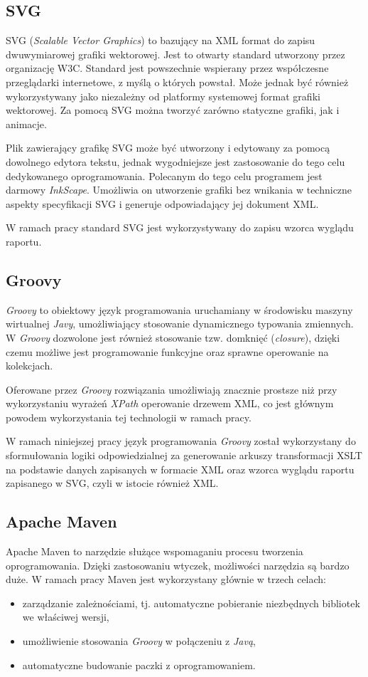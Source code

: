 \documentclass[11pt,a4paper]{article}
\begin{document}
\subsection{SVG} \label{tools:svg}
SVG (\emph{Scalable Vector Graphics}) to bazujący na XML format do zapisu dwuwymiarowej grafiki wektorowej. Jest to otwarty standard utworzony przez organizację W3C. Standard jest powszechnie wspierany przez współczesne przeglądarki internetowe, z myślą o których powstał. Może jednak być również wykorzystywany jako niezależny od platformy systemowej format grafiki wektorowej. Za pomocą SVG można tworzyć zarówno statyczne grafiki, jak i animacje.

Plik zawierający grafikę SVG może być utworzony i edytowany za pomocą dowolnego edytora tekstu, jednak wygodniejsze jest zastosowanie do tego celu dedykowanego oprogramowania. Polecanym do tego celu programem jest darmowy \emph{InkScape}. Umożliwia on utworzenie grafiki bez wnikania w techniczne aspekty specyfikacji SVG i generuje odpowiadający jej dokument XML.

W ramach pracy standard SVG jest wykorzystywany do zapisu wzorca wyglądu raportu. 

\subsection{Groovy} \label{tools:groovy}
\emph{Groovy} to obiektowy język programowania uruchamiany w środowisku maszyny wirtualnej \emph{Javy}, umożliwiający stosowanie dynamicznego typowania zmiennych. W \emph{Groovy} dozwolone jest również stosowanie tzw. domknięć (\emph{closure}), dzięki czemu możliwe jest programowanie funkcyjne oraz sprawne operowanie na kolekcjach. 

Oferowane przez \emph{Groovy} rozwiązania umożliwiają znacznie prostsze niż przy wykorzystaniu wyrażeń \emph{XPath} operowanie drzewem XML, co jest głównym powodem wykorzystania tej technologii w ramach pracy.

W ramach niniejszej pracy język programowania \emph{Groovy} został wykorzystany do sformułowania logiki odpowiedzialnej za generowanie arkuszy transformacji XSLT na podstawie danych zapisanych w formacie XML oraz wzorca wyglądu raportu zapisanego w SVG, czyli w istocie również XML. 

\subsection{Apache Maven} \label{tools:maven}
Apache Maven to narzędzie służące wspomaganiu procesu tworzenia oprogramowania. Dzięki zastosowaniu wtyczek, możliwości narzędzia są bardzo duże. W ramach pracy Maven jest wykorzystany głównie w trzech celach: 
\begin{itemize}
\item zarządzanie zależnościami, tj. automatyczne pobieranie niezbędnych bibliotek we właściwej wersji,
\item umożliwienie stosowania \emph{Groovy} w połączeniu z \emph{Javą},
\item automatyczne budowanie paczki z oprogramowaniem.
\end{itemize} 
\end{document}
